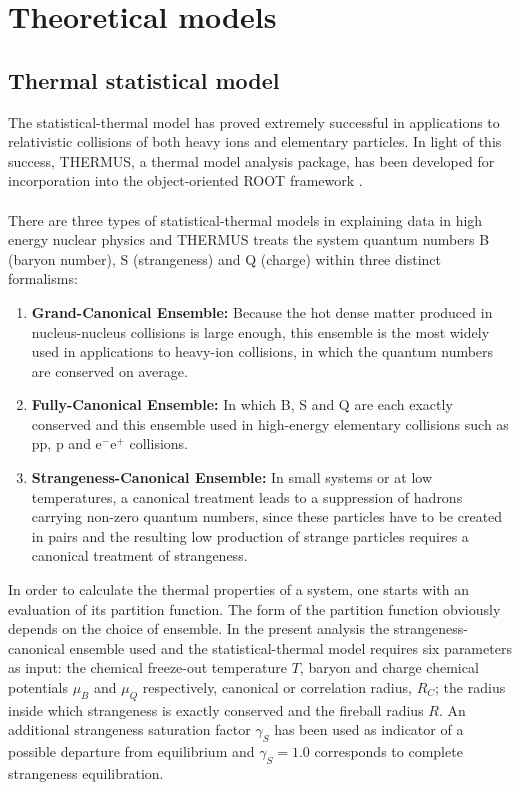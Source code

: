 \section{Theoretical models}
\subsection{Thermal statistical model}

The statistical-thermal model has proved extremely successful in applications to relativistic collisions of both heavy ions and elementary particles. In light of this success, THERMUS, a thermal model analysis package, has been developed for incorporation into the object-oriented ROOT framework \cite{Wheaton:2004qb}.\\ \\
There are three types of statistical-thermal models in explaining data in high energy nuclear physics and THERMUS treats the system quantum numbers B (baryon number), S (strangeness) and Q (charge) within three distinct formalisms: 

\begin{enumerate}
\item \textbf{Grand-Canonical Ensemble:} Because the hot dense matter produced in nucleus-nucleus collisions is large enough, this ensemble is the most widely used in applications to heavy-ion collisions, in which the quantum numbers are conserved on average. 
\item \textbf{Fully-Canonical Ensemble:} In which B, S and Q are each exactly conserved and this ensemble used in high-energy elementary collisions such as pp, p\pbar{} and e$^{-}$e$^{+}$ collisions.
\item \textbf{Strangeness-Canonical Ensemble:}  In small systems or at low temperatures, a canonical treatment leads to a suppression of hadrons carrying non-zero quantum numbers, since these particles have to be created in pairs and the resulting low production of strange particles requires a canonical treatment of strangeness.  
 \end{enumerate}
 In order to calculate the thermal properties of a system, one starts with an evaluation of its partition function. The form of the partition function obviously depends on the choice of ensemble. In the present analysis the strangeness-canonical ensemble used and the statistical-thermal model requires six parameters as input: the chemical freeze-out temperature $T$, baryon and charge chemical potentials $\mu_{B}$ and $\mu_{Q}$ respectively, canonical or correlation radius, $R_{C}$; the radius inside which strangeness is exactly conserved and the fireball radius $R$. An additional strangeness saturation factor $\gamma_{S}$ has been used as indicator of a possible departure from equilibrium and $\gamma_{S}=1.0$ corresponds to complete strangeness equilibration.
 

